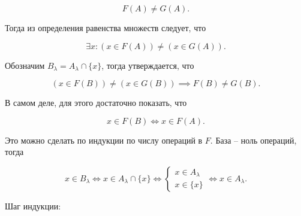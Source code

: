 \begin{equation*}
    F(A) \ne G(A).
\end{equation*}

Тогда из определения равенства множеств следует, что

\begin{equation*}
    \exists x: (x \in F(A)) \ne (x \in G(A)).
\end{equation*}

Обозначим $B_\lambda = A_\lambda \cap \{x\}$, тогда утверждается, что

\begin{equation*}
    (x \in F(B)) \ne (x \in G(B)) \implies F(B) \ne G(B).
\end{equation*}

В самом деле, для этого достаточно показать, что

\begin{equation*}
    x \in F(B) \Longleftrightarrow x \in F(A).
\end{equation*}

Это можно сделать по индукции по числу операций в $F$. База -- ноль операций, тогда

\begin{equation*}
    x \in B_\lambda
    \Longleftrightarrow
    x \in A_\lambda \cap \{x\}
    \Longleftrightarrow
    \begin{cases}
        x \in A_\lambda \\
        x \in \{x\}
    \end{cases}
    \Longleftrightarrow
    x \in A_\lambda.
\end{equation*}

Шаг индукции:

